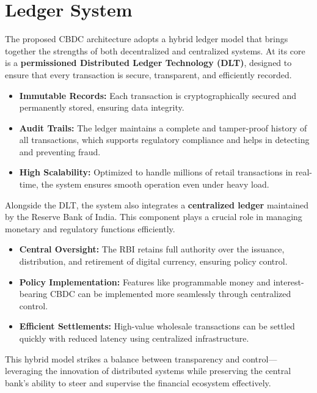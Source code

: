 \section{Ledger System}

The proposed CBDC architecture adopts a hybrid ledger model that brings together the strengths of both decentralized and centralized systems. At its core is a \textbf{permissioned Distributed Ledger Technology (DLT)}, designed to ensure that every transaction is secure, transparent, and efficiently recorded.

\begin{itemize}
    \item \textbf{Immutable Records:} Each transaction is cryptographically secured and permanently stored, ensuring data integrity.
    \item \textbf{Audit Trails:} The ledger maintains a complete and tamper-proof history of all transactions, which supports regulatory compliance and helps in detecting and preventing fraud.
    \item \textbf{High Scalability:} Optimized to handle millions of retail transactions in real-time, the system ensures smooth operation even under heavy load.
\end{itemize}

Alongside the DLT, the system also integrates a \textbf{centralized ledger} maintained by the Reserve Bank of India. This component plays a crucial role in managing monetary and regulatory functions efficiently.

\begin{itemize}
    \item \textbf{Central Oversight:} The RBI retains full authority over the issuance, distribution, and retirement of digital currency, ensuring policy control.
    \item \textbf{Policy Implementation:} Features like programmable money and interest-bearing CBDC can be implemented more seamlessly through centralized control.
    \item \textbf{Efficient Settlements:} High-value wholesale transactions can be settled quickly with reduced latency using centralized infrastructure.
\end{itemize}

This hybrid model strikes a balance between transparency and control—leveraging the innovation of distributed systems while preserving the central bank's ability to steer and supervise the financial ecosystem effectively.


